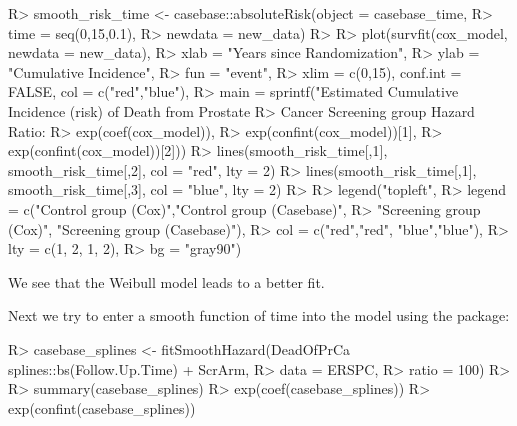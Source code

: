 \documentclass[
]{jss}
\begin{document}
\begin{CodeChunk}

\begin{CodeInput}
R> smooth_risk_time <- casebase::absoluteRisk(object = casebase_time, 
R>                                           time = seq(0,15,0.1), 
R>                                           newdata = new_data)
R> 
R> plot(survfit(cox_model, newdata = new_data),
R>      xlab = "Years since Randomization", 
R>      ylab = "Cumulative Incidence", 
R>      fun = "event",
R>      xlim = c(0,15), conf.int = FALSE, col = c("red","blue"), 
R>      main = sprintf("Estimated Cumulative Incidence (risk) of Death from Prostate 
R>                     Cancer Screening group Hazard Ratio: %
R>                     exp(coef(cox_model)), 
R>                     exp(confint(cox_model))[1], 
R>                     exp(confint(cox_model))[2]))
R> lines(smooth_risk_time[,1], smooth_risk_time[,2], col = "red", lty = 2)
R> lines(smooth_risk_time[,1], smooth_risk_time[,3], col = "blue", lty = 2)
R> 
R> legend("topleft", 
R>        legend = c("Control group (Cox)","Control group (Casebase)",
R>                   "Screening group (Cox)", "Screening group (Casebase)"), 
R>        col = c("red","red", "blue","blue"),
R>        lty = c(1, 2, 1, 2), 
R>        bg = "gray90")
\end{CodeInput}
\end{CodeChunk}

We see that the Weibull model leads to a better fit.

Next we try to enter a smooth function of time into the model using the
 package:

\begin{CodeChunk}

\begin{CodeInput}
R> casebase_splines <- fitSmoothHazard(DeadOfPrCa ~ splines::bs(Follow.Up.Time) + ScrArm, 
R>                                     data = ERSPC, 
R>                                     ratio = 100)
R> 
R> summary(casebase_splines)
R> exp(coef(casebase_splines))
R> exp(confint(casebase_splines))
\end{CodeInput}
\end{CodeChunk}
\end{document}

